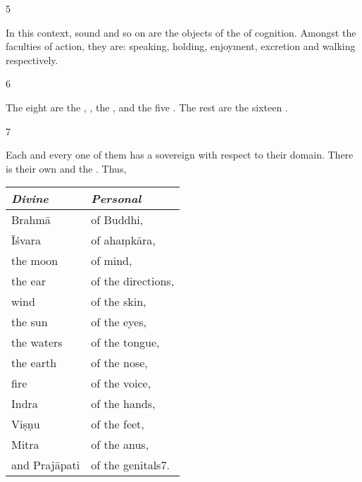 \begin{translation}
\item[5]    

In this context, sound and so on are the objects of the  of 
cognition.  Amongst the faculties of action, they are: speaking, holding, 
enjoyment, excretion and walking respectively.  

\item[6]

The eight  are 
the ,
, 
the , 
and the five .
The rest are the sixteen .
    
\item[7]   

Each and every one of them has a sovereign with respect to their
domain.  There is their own  and the
. Thus, \\
\begin{center}
\begin{tabular}{ll}
\toprule
\emph{Divine} & \emph{Personal}\\
\midrule
    Brahmā & of Buddhi,\\
Īśvara &of ahaṃkāra,\\
the moon &of mind,\\
the ear &of the directions,\\
wind &of the skin,\\
the sun & of the eyes,\\
the waters &of the tongue,\\
the earth &of the nose,\\
fire &of the voice,\\
Indra & of the hands,\\
Viṣṇu &of the feet,\\
Mitra & of the anus,\\
and Prajāpati &of the genitals7.\\
\bottomrule
\end{tabular}
\end{center}









\end{translation}
